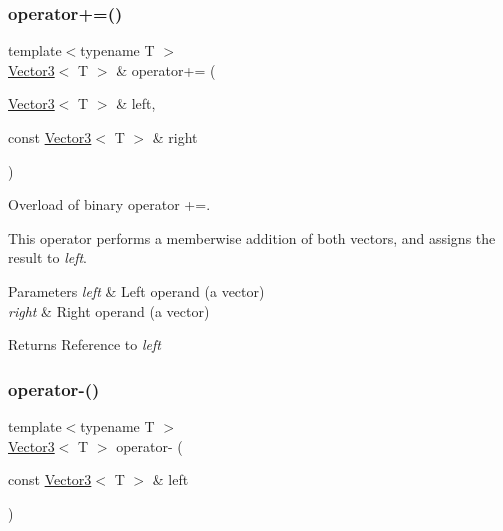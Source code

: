 \subsubsection{\texorpdfstring{operator+=()}{operator+=()}}
{\footnotesize\ttfamily template$<$typename T $>$ \\
\mbox{\hyperlink{classsf_1_1_vector3}{Vector3}}$<$ T $>$ \& operator+= (\begin{DoxyParamCaption}\item[{\mbox{\hyperlink{classsf_1_1_vector3}{Vector3}}$<$ T $>$ \&}]{left,  }\item[{const \mbox{\hyperlink{classsf_1_1_vector3}{Vector3}}$<$ T $>$ \&}]{right }\end{DoxyParamCaption})\hspace{0.3cm}{\ttfamily [related]}}



Overload of binary operator +=. 

This operator performs a memberwise addition of both vectors, and assigns the result to {\itshape left}.


\begin{DoxyParams}{Parameters}
{\em left} & Left operand (a vector) \\
\hline
{\em right} & Right operand (a vector)\\
\hline
\end{DoxyParams}
\begin{DoxyReturn}{Returns}
Reference to {\itshape left} \begin{DoxyVerb}\end{DoxyVerb}
 
\end{DoxyReturn}
\mbox{\label{classsf_1_1_vector3_a9b75d2fb9b0f2fd9fe33f8f06f9dda75}} 
\subsubsection{\texorpdfstring{operator-\/()}{operator-()}\hspace{0.1cm}{\footnotesize\ttfamily [1/2]}}
{\footnotesize\ttfamily template$<$typename T $>$ \\
\mbox{\hyperlink{classsf_1_1_vector3}{Vector3}}$<$ T $>$ operator-\/ (\begin{DoxyParamCaption}\item[{const \mbox{\hyperlink{classsf_1_1_vector3}{Vector3}}$<$ T $>$ \&}]{left }\end{DoxyParamCaption})\hspace{0.3cm}{\ttfamily [related]}}



